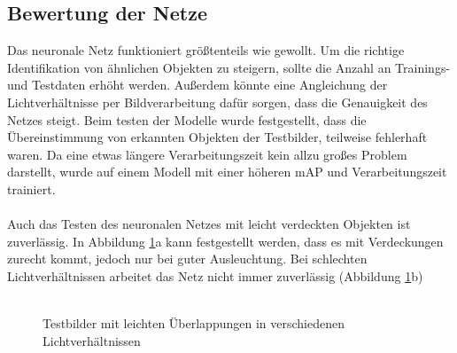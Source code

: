 \documentclass[a4paper,12pt,oneside]{article}
\begin{document}
\subsection{Bewertung der Netze}
Das neuronale Netz funktioniert größtenteils wie gewollt. Um die richtige Identifikation von ähnlichen Objekten zu steigern, sollte die Anzahl an Trainings- und Testdaten erhöht werden. Außerdem könnte eine Angleichung der Lichtverhältnisse per Bildverarbeitung dafür sorgen, dass die Genauigkeit des Netzes steigt. Beim testen der Modelle wurde festgestellt, dass die Übereinstimmung von erkannten Objekten der Testbilder, teilweise fehlerhaft waren. Da eine etwas längere Verarbeitungszeit kein allzu großes Problem darstellt, wurde auf einem Modell mit einer höheren mAP und Verarbeitungszeit trainiert.\\
\\
Auch das Testen des neuronalen Netzes mit leicht verdeckten Objekten ist zuverlässig. In Abbildung \ref{img:ueber2}a kann festgestellt werden, dass es mit Verdeckungen zurecht kommt, jedoch nur bei guter Ausleuchtung. Bei schlechten Lichtverhältnissen arbeitet das Netz nicht immer zuverlässig (Abbildung \ref{img:ueber2}b)
\\
\\
\begin{figure} 
	[h]
	\centering
\caption{Testbilder mit leichten Überlappungen in verschiedenen Lichtverhältnissen}
\label{img:ueber2} 
\end{figure} 
\end{document}
